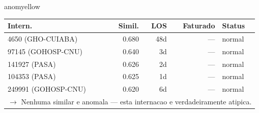 \documentclass[a4paper,10pt]{article}
\begin{document}
\begin{anomalycard}[Internacao 58046 | GHO-PETROBRAS | MODERADO (z=2.94)]{anomyellow}
\begin{tabular}{l r r r l}\toprule\textbf{Intern.} & \textbf{Simil.} & \textbf{LOS} & \textbf{Faturado} & \textbf{Status} \\\midrule
4650 (GHO-CUIABA) & 0.680 & 48d & --- & \textcolor{jcubeblue}{normal} \\
97145 (GOHOSP-CNU) & 0.640 & 3d & --- & \textcolor{jcubeblue}{normal} \\
141927 (PASA) & 0.626 & 2d & --- & \textcolor{jcubeblue}{normal} \\
104353 (PASA) & 0.625 & 1d & --- & \textcolor{jcubeblue}{normal} \\
249991 (GOHOSP-CNU) & 0.620 & 6d & --- & \textcolor{jcubeblue}{normal} \\
\multicolumn{5}{l}{\textcolor{jcubeblue}{\small $\rightarrow$ Nenhuma similar e anomala --- esta internacao e verdadeiramente atipica.}} \\
\bottomrule\end{tabular}


\end{anomalycard}

\newpage
\end{document}
